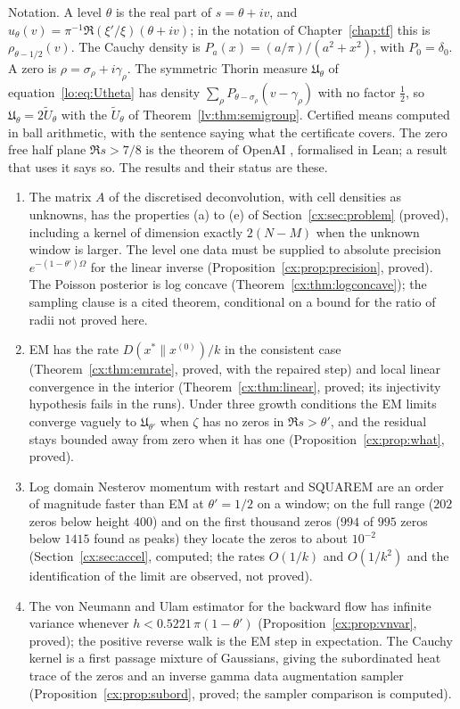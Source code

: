 Notation. A level $\theta$ is the real part of $s=\theta+iv$, and $u_\theta(v)=\pi^{-1}\Re(\xi'/\xi)(\theta+iv)$; in the notation of Chapter~\ref{chap:tf} this is $\rho_{\theta-1/2}(v)$. The Cauchy density is $P_a(x)=(a/\pi)/(a^2+x^2)$, with $P_0=\delta_0$. A zero is $\rho=\sigma_\rho+i\gamma_\rho$. The symmetric Thorin measure $\mathfrak U_\theta$ of equation~\eqref{lo:eq:Utheta} has density $\sum_\rho P_{\theta-\sigma_\rho}(v-\gamma_\rho)$ with no factor $\tfrac12$, so $\mathfrak U_\theta=2\widetilde U_\theta$ with the $\widetilde U_\theta$ of Theorem~\ref{lv:thm:semigroup}. Certified means computed in ball arithmetic, with the sentence saying what the certificate covers. The zero free half plane $\Re s>7/8$ is the theorem of OpenAI \cite{OAI26a}, formalised in Lean; a result that uses it says so. The results and their status are these.
\begin{enumerate}
\item The matrix $A$ of the discretised deconvolution, with cell densities as unknowns, has the properties (a) to (e) of Section~\ref{cx:sec:problem} (proved), including a kernel of dimension exactly $2(N-M)$ when the unknown window is larger. The level one data must be supplied to absolute precision $e^{-(1-\theta')\Omega}$ for the linear inverse (Proposition~\ref{cx:prop:precision}, proved). The Poisson posterior is log concave (Theorem~\ref{cx:thm:logconcave}); the sampling clause is a cited theorem, conditional on a bound for the ratio of radii not proved here.
\item EM has the rate $D(x^*\|x^{(0)})/k$ in the consistent case (Theorem~\ref{cx:thm:emrate}, proved, with the repaired step) and local linear convergence in the interior (Theorem~\ref{cx:thm:linear}, proved; its injectivity hypothesis fails in the runs). Under three growth conditions the EM limits converge vaguely to $\mathfrak U_{\theta'}$ when $\zeta$ has no zeros in $\Re s>\theta'$, and the residual stays bounded away from zero when it has one (Proposition~\ref{cx:prop:what}, proved).
\item Log domain Nesterov momentum with restart and SQUAREM are an order of magnitude faster than EM at $\theta'=1/2$ on a window; on the full range ($202$ zeros below height $400$) and on the first thousand zeros ($994$ of $995$ zeros below $1415$ found as peaks) they locate the zeros to about $10^{-2}$ (Section~\ref{cx:sec:accel}, computed; the rates $O(1/k)$ and $O(1/k^2)$ and the identification of the limit are observed, not proved).
\item The von Neumann and Ulam estimator for the backward flow has infinite variance whenever $h<0.5221\,\pi(1-\theta')$ (Proposition~\ref{cx:prop:vnvar}, proved); the positive reverse walk is the EM step in expectation. The Cauchy kernel is a first passage mixture of Gaussians, giving the subordinated heat trace of the zeros and an inverse gamma data augmentation sampler (Proposition~\ref{cx:prop:subord}, proved; the sampler comparison is computed).

\end{enumerate}
